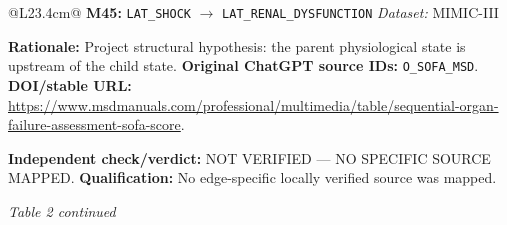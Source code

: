 \begin{tabular}{@{}L{23.4cm}@{}}
\addlinespace[2pt]
\midrule
\textbf{M45:} \nolinkurl{LAT_SHOCK} $\rightarrow$ \nolinkurl{LAT_RENAL_DYSFUNCTION} \hfill \textit{Dataset:} MIMIC-III\par\textbf{Rationale:} Project structural hypothesis: the parent physiological state is upstream of the child state. \textbf{Original ChatGPT source IDs:} \nolinkurl{O_SOFA_MSD}. \textbf{DOI/stable URL:} \url{https://www.msdmanuals.com/professional/multimedia/table/sequential-organ-failure-assessment-sofa-score}.\par\textbf{Independent check/verdict:} NOT VERIFIED --- NO SPECIFIC SOURCE MAPPED. \textbf{Qualification:} No edge-specific locally verified source was mapped. \\
\addlinespace[2pt]
\midrule
\bottomrule
\end{tabular}
\clearpage
\textit{Table 2 continued}\par
